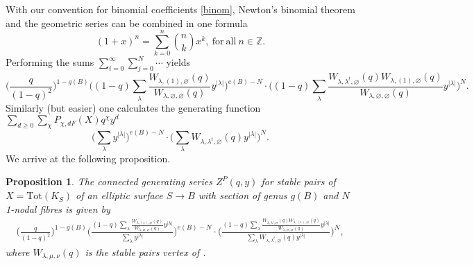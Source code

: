 \documentclass[12pt]{amsart}
\newtheorem{proposition}[theorem]{Proposition}
\theoremstyle{definition}
\theoremstyle{property}
\newcommand\Z{\mathbb Z}
\renewcommand\_{^{}_}
\begin{document}
With our convention for binomial coefficients \eqref{binom}, Newton's binomial theorem and the geometric series can be combined in one formula
\[
(1+x)^n = \sum_{k =0}^{n} \binom{n}{k} x^k, \ \mathrm{for \ all \ } n \in \Z.
\]
Performing the sums $\sum_{i = 0}^{\infty} \sum_{j=0}^{N} \cdots$ yields
\[
\bigg( \frac{q}{(1-q)^2} \bigg)^{1-g(B)} \Bigg( (1-q) \sum_{\lambda} \frac{W_{\lambda, (1), \varnothing}(q)}{W_{\lambda,\varnothing,\varnothing}(q)} y^{|\lambda|} \Bigg)^{e(B) - N} \cdot \Bigg( (1-q) \sum_{\lambda} \frac{W_{\lambda, \lambda^{t}, \varnothing}(q) W_{\lambda, (1), \varnothing}(q)}{W_{\lambda,\varnothing,\varnothing}(q)} y^{|\lambda|} \Bigg)^{N}.
\]
Similarly (but easier) one calculates the generating function $\sum_{d \geq 0} \sum_{\chi} P_{\chi,dF}(X) q^{\chi} y^d$
\[
\Bigg( \sum_{\lambda} y^{|\lambda|} \Bigg)^{e(B) - N} \cdot \Bigg( \sum_{\lambda} W_{\lambda, \lambda^{t}, \varnothing}(q) y^{|\lambda|} \Bigg)^{N}.
\]
We arrive at the following proposition.
\begin{proposition} \label{mainprop}
The connected generating series $Z^{P}(q,y)$ for stable pairs of $X = \mathrm{Tot}(K_S)$ of an elliptic surface $S \rightarrow B$ with section of genus $g(B)$ and $N$ 1-nodal fibres is given by
\begin{align*}
\bigg( \frac{q}{(1-q)^2} \bigg)^{1-g(B)} \Bigg( \frac{(1-q) \sum_{\lambda} \frac{W_{\lambda, (1), \varnothing}(q)}{W_{\lambda,\varnothing,\varnothing}(q)} y^{|\lambda|}}{\sum_{\lambda} y^{|\lambda|}} \Bigg)^{e(B) - N} \cdot \Bigg( \frac{(1-q) \sum_{\lambda} \frac{W_{\lambda, \lambda^{t}, \varnothing}(q) W_{\lambda, (1), \varnothing}(q)}{W_{\lambda,\varnothing,\varnothing}(q)} y^{|\lambda|}}{\sum_{\lambda} W_{\lambda, \lambda^{t}, \varnothing}(q) y^{|\lambda|}} \Bigg)^{N},
\end{align*}
where $W_{\lambda, \mu, \nu}(q)$ is the stable pairs vertex of \cite{PT2}.
\end{proposition}
\end{document}
